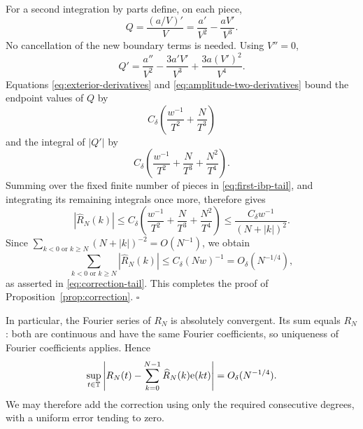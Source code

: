 For a second integration by parts define, on each piece,
\[
 Q=\frac{(a/V)'}{V}
   =\frac{a'}{V^2}-\frac{aV'}{V^3}.
\]
No cancellation of the new boundary terms is needed.  Using $V''=0$,
\begin{equation}\label{eq:second-ibp-algebra}
 Q'=\frac{a''}{V^2}
       -\frac{3a'V'}{V^3}
       +\frac{3a(V')^2}{V^4}.
\end{equation}
Equations \eqref{eq:exterior-derivatives} and
\eqref{eq:amplitude-two-derivatives} bound the endpoint values of $Q$ by
\[
 C_\delta\left(\frac{w^{-1}}{T^2}+\frac{N}{T^3}\right)
\]
and the integral of $|Q'|$ by
\[
 C_\delta\left(\frac{w^{-1}}{T^2}
                 +\frac{N}{T^3}+\frac{N^2}{T^4}\right).
\]
Summing over the fixed finite number of pieces in
\eqref{eq:first-ibp-tail}, and integrating its remaining integrals once
more, therefore gives
\[
 |\widehat R_N(k)|
 \le C_\delta\left(\frac{w^{-1}}{T^2}
                 +\frac{N}{T^3}+\frac{N^2}{T^4}\right)
 \le \frac{C_\delta w^{-1}}{(N+|k|)^2}.
\]
Since
$\sum_{k<0\text{ or }k\ge N}(N+|k|)^{-2}=O(N^{-1})$,
we obtain
\[
 \sum_{k<0\text{ or }k\ge N}|\widehat R_N(k)|
       \le C_\delta(Nw)^{-1}=O_\delta(N^{-1/4}),
\]
as asserted in \eqref{eq:correction-tail}.  This completes the proof
of Proposition~\ref{prop:correction}.
\hfill$\square$

In particular, the Fourier series of $R_N$ is absolutely convergent.
Its sum equals $R_N$: both are continuous and have the same Fourier
coefficients, so uniqueness of Fourier coefficients applies.  Hence
\begin{equation}\label{eq:correction-projection}
 \sup_{t\in\mathbb T}
 \left|R_N(t)-\sum_{k=0}^{N-1}\widehat R_N(k)\mathrm e(kt)\right|
       =O_\delta(N^{-1/4}).
\end{equation}
We may therefore add the correction using only the required consecutive
degrees, with a uniform error tending to zero.
